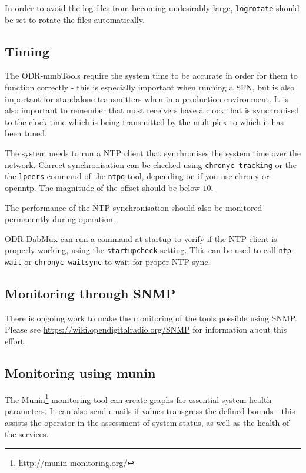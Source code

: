 
In order to avoid the log files from becoming undesirably large, \texttt{logrotate}
should be set to rotate the files automatically.



\subsection{Timing}
The ODR-mmbTools require the system time to be accurate in order for them to
function correctly - this is especially important when running a SFN, but is
also important for standalone transmitters when in a production environment. It
is also important to remember that most receivers have a clock that is
synchronised to the clock time which is being transmitted by the multiplex to
which it has been tuned.

The system needs to run a NTP client that synchronises the system time over the
network. Correct synchronisation can be checked using \texttt{chronyc tracking}
or the the \texttt{lpeers} command of the \texttt{ntpq} tool, depending on if
you use chrony or openntp.
The magnitude of the offset should be below $10$\ms.

The performance of the NTP synchronisation should also be monitored permanently
during operation.

ODR-DabMux can run a command at startup to verify if the NTP client is properly
working, using the \texttt{startupcheck} setting. This can be used to call
\texttt{ntp-wait} or \texttt{chronyc waitsync} to wait for proper NTP sync.

\subsection{Monitoring through SNMP}
There is ongoing work to make the monitoring of the tools possible using SNMP.
Please see \url{https://wiki.opendigitalradio.org/SNMP} for information about
this effort.

\subsection{Monitoring using munin}
\label{monitmunin}
The Munin\footnote{\url{http://munin-monitoring.org/}} monitoring tool can
create graphs for essential system health parameters. It can also send emails
if values transgress the defined bounds - this assists the operator in the
assessment of system status, as well as the health of the services.

